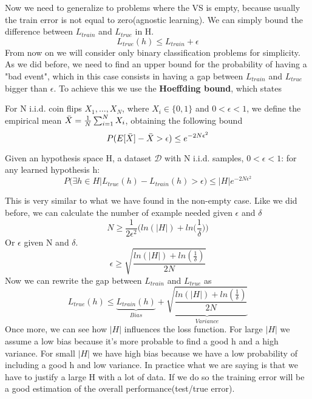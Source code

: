 \documentclass[../main.tex]{subfiles}
\begin{document}
Now we need to generalize to problems where the VS is empty, because usually the train error is not equal to zero(agnostic learning). We can simply bound the difference between $L_{train}$ and $L_{true}$ in H.
\begin{equation*}
    L_{true}(h) \leq L_{train} + \epsilon
\end{equation*}
From now on we will consider only binary classification problems for simplicity. As we did before, we need to find an upper bound for the probability of having a "bad event", which in this case consists in having a gap between $L_{train}$ and $L_{true}$ bigger than $\epsilon$. To achieve this we use the \textbf{Hoeffding bound}, which states
\begin{definition}
    For N i.i.d. coin flips $X_1, \dots, X_N$, where $X_i \in \{0,1\}$ and $0 < \epsilon < 1$, we define the empirical mean $\Bar{X}=\frac{1}{N}\sum_{i=1}^N X_i$, obtaining the following bound
    \begin{equation*}
        P(E[\Bar{X}]-\Bar{X} > \epsilon) \leq e^{-2N\epsilon^2}
    \end{equation*}
\end{definition}
\begin{theorem}
    Given an hypothesis space H, a dataset $\mathcal{D}$ with N i.i.d. samples, $0< \epsilon <1$: for any learned hypothesis h:
    \begin{equation*}
        P(\exists h \in H | L_{true}(h)-L_{train}(h) > \epsilon) \leq |H|e^{-2N \epsilon^2}
    \end{equation*}
\end{theorem}
This is very similar to what we have found in the non-empty case. Like we did before, we can calculate the number of example needed given $\epsilon$ and $\delta$
\begin{equation*}
    N \geq \frac{1}{2 \epsilon^2} \bigg( ln(|H|) + ln\bigg( \frac{1}{\delta} \bigg) \bigg)
\end{equation*}
Or $\epsilon$ given N and $\delta$.
\begin{equation*}
    \epsilon \geq \sqrt{\frac{ln(|H|) + ln( \frac{1}{\delta} )}{2N}}
\end{equation*}
Now we can rewrite the gap between $L_{train}$ and $L_{true}$ as
\begin{equation}
    L_{true}(h) \leq \underbrace{L_{train}(h)}_{Bias} + \underbrace{\sqrt{\frac{ln(|H|) + ln( \frac{1}{\delta} )}{2N}}}_{Variance}
\end{equation}
Once more, we can see how $|H|$ influences the loss function. For large $|H|$ we assume a low bias because it's more probable to find a good h and a high variance. For small $|H|$ we have high bias because we have a low probability of including a good h and low variance. In practice what we are saying is that we have to justify a large H with a lot of data. If we do so the training error will be a good estimation of the overall performance(test/true error).
\end{document}
